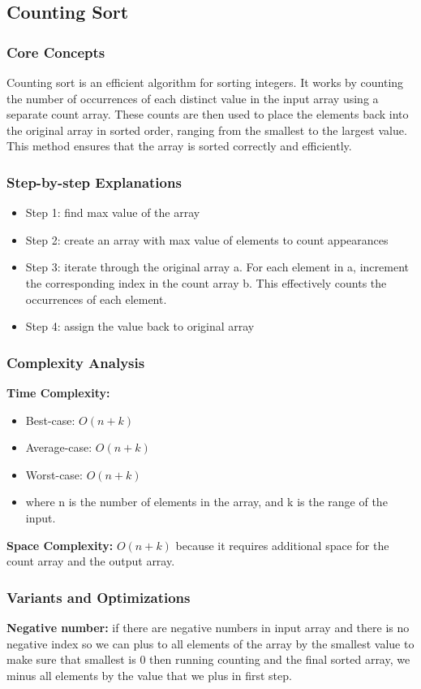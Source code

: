 \subsection{Counting Sort}

\subsubsection{Core Concepts}
Counting sort is an efficient algorithm for sorting integers. It works by counting the number of occurrences of each distinct value in the input array using a separate count array. These counts are then used to place the elements back into the original array in sorted order, ranging from the smallest to the largest value. This method ensures that the array is sorted correctly and efficiently. ~\cite{ref3}
\subsubsection{Step-by-step Explanations}
\begin{itemize}[label=-]
    \item Step 1: find max value of the array
    \item Step 2: create an array with max value of elements to count appearances
    \item Step 3: iterate through the original array a. For each element in a, increment the corresponding index in the count array b. This effectively counts the occurrences of each element.
    \item Step 4: assign the value back to original array
\end{itemize}

\subsubsection{Complexity Analysis}
\textbf{Time Complexity:}
\begin{itemize}
    \item Best-case: $O(n + k)$
    \item Average-case: $O(n + k)$
    \item Worst-case: $O(n + k)$
    \item where n is the number of elements in the array, and k is the range of the input.
\end{itemize}

\textbf{Space Complexity:} $O(n + k)$ because it requires additional space for the count array and the output array.

\subsubsection{Variants and Optimizations}
\textbf{Negative number:} if there are negative numbers in input array and there is no negative index so we can plus to all elements of the array by the smallest value to make sure that smallest is 0 then running counting and the final sorted array, we minus all elements by the value that we plus in first step.

\vspace{10pt}
